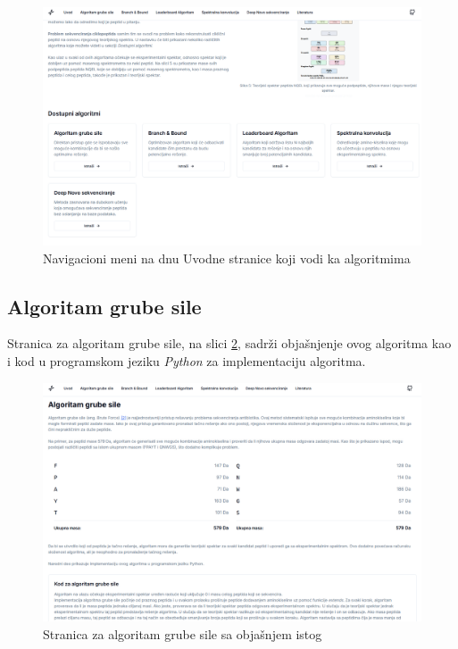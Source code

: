 \documentclass[12pt,oneside]{memoir}
\begin{document}
\begin{figure}[H]
\centering
\includegraphics[width=1\textwidth]{images/intro_2.png}
\caption{Navigacioni meni na dnu Uvodne stranice koji vodi ka algoritmima}
\label{fig:intro_2}
\end{figure}

\subsection{Algoritam grube sile}

Stranica za algoritam grube sile, na slici \ref{fig:brute_force_1}, sadrži objašnjenje ovog algoritma kao i kod u programskom jeziku \emph{Python} za implementaciju algoritma.
\begin{figure}[h]
\centering
\includegraphics[width=1\textwidth]{images/brute_force_1.png}
\caption{Stranica za algoritam grube sile sa objašnjem istog}
\label{fig:brute_force_1}
\end{figure}
\end{document}
